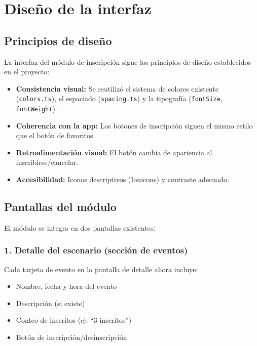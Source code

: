 
\section{Dise\~no de la interfaz}

\subsection{Principios de dise\~no}

La interfaz del m\'odulo de inscripci\'on sigue los principios de
dise\~no establecidos en el proyecto:

\begin{itemize}
  \item \textbf{Consistencia visual:} Se reutiliz\'o el sistema de
    colores existente (\texttt{colors.ts}), el espaciado
    (\texttt{spacing.ts}) y la tipograf\'ia (\texttt{fontSize},
    \texttt{fontWeight}).
  \item \textbf{Coherencia con la app:} Los botones de inscripci\'on
    siguen el mismo estilo que el bot\'on de favoritos.
  \item \textbf{Retroalimentaci\'on visual:} El bot\'on cambia de
    apariencia al inscribirse/cancelar.
  \item \textbf{Accesibilidad:} Iconos descriptivos (Ionicons) y
    contraste adecuado.
\end{itemize}

\subsection{Pantallas del m\'odulo}

El m\'odulo se integra en dos pantallas existentes:

\subsubsection*{1. Detalle del escenario (secci\'on de eventos)}

Cada tarjeta de evento en la pantalla de detalle ahora incluye:

\begin{itemize}
  \item Nombre, fecha y hora del evento
  \item Descripci\'on (si existe)
  \item Conteo de inscritos (ej: ``3 inscritos'')
  \item Bot\'on de inscripci\'on/desinscripci\'on
\end{itemize}

